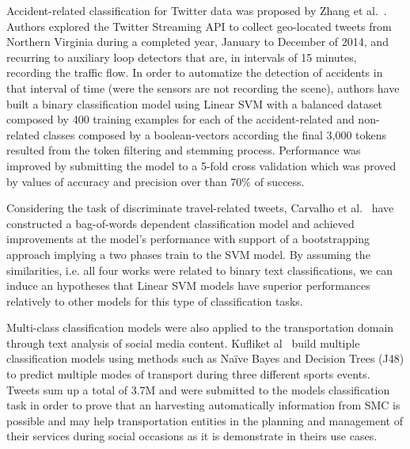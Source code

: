 Accident-related classification for Twitter data was proposed by Zhang et al.~\cite{zhang2016mining}. Authors explored the Twitter Streaming API to collect geo-located tweets from Northern Virginia during a completed year, January to December of 2014, and recurring to auxiliary loop detectors that are, in intervals of 15 minutes, recording the traffic flow. In order to automatize the detection of accidents in that interval of time (were the sensors are not recording the scene), authors have built a binary classification model using Linear SVM with a balanced dataset composed by 400 training examples for each of the accident-related and non-related classes composed by a boolean-vectors according the final 3,000 tokens resulted from the token filtering and stemming process. Performance was improved by submitting the model to a 5-fold cross validation which was proved by values of accuracy and precision over than 70\% of success.


Considering the task of discriminate travel-related tweets, Carvalho et al.~\cite{carvalho2010real} have constructed a bag-of-words dependent classification model and achieved improvements at the model's performance with support of a bootstrapping approach implying a two phases train to the SVM model.  By assuming the similarities, i.e. all four works were related to binary text classifications, we can induce an hypotheses that Linear SVM models have superior performances relatively to other models for this type of classification tasks.

Multi-class classification models were also applied to the transportation domain through text analysis of social media content. Kufliket al~\cite{kuflik2017automating} build multiple classification models using methods such as Naïve Bayes and Decision Trees (J48) to predict multiple modes of transport during three different sports events. Tweets sum up a total of 3.7M and were submitted to the models classification task in order to prove that an harvesting automatically information from \gls{SMC} is possible and may help transportation entities in the planning and management of their services during social occasions as it is demonstrate in theirs use cases.

